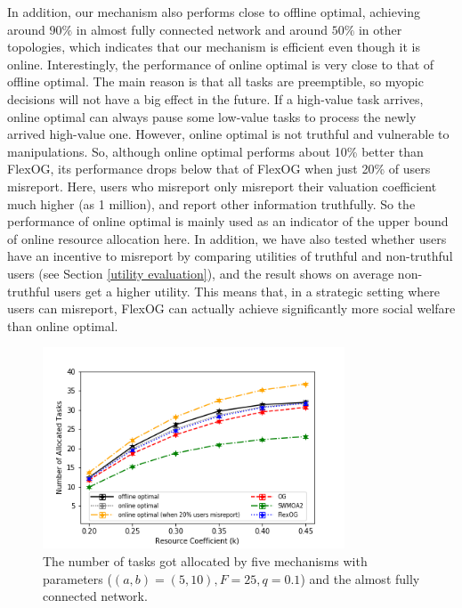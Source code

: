 \documentclass[11pt]{phdthesis}
\begin{document}
In addition, our mechanism also performs close to offline optimal, achieving around $ 90\% $ in almost fully connected network and around $50\%$ in other topologies, which indicates that our mechanism is efficient even though it is online. Interestingly, the performance of online optimal is very close to that of offline optimal. The main reason is that all tasks are preemptible, so myopic decisions will not have a big effect in the future. If a high-value task arrives, online optimal can always pause some low-value tasks to process the newly arrived high-value one. However, online optimal is not truthful and vulnerable to manipulations. So, although online optimal performs about 10\% better than FlexOG, its performance drops below that of FlexOG when just 20\% of users misreport. Here, users who misreport only misreport their valuation coefficient much higher (as 1 million), and report other information truthfully. So the performance of online optimal is mainly used as an indicator of the upper bound of online resource allocation here. In addition, we have also tested whether users have an incentive to misreport by comparing utilities of truthful and non-truthful users (see Section \ref{utility evaluation}), and the result shows on average non-truthful users get a higher utility. This means that, in a strategic setting where users can misreport, FlexOG can actually achieve significantly more social welfare than online optimal. 


\begin{figure}[h]
    \centering
    \includegraphics[width=0.8\textwidth]{./Figures/comparison of accepted number (resource-coefficient) (ring).png}
    \caption{The number of tasks got allocated by five mechanisms with parameters ($ (a, b) = (5, 10), F = 25, q = 0.1 $) and the almost fully connected network.}
    \label{fig: accepted_number_resource_coefficient} 
\end{figure}
\end{document}
